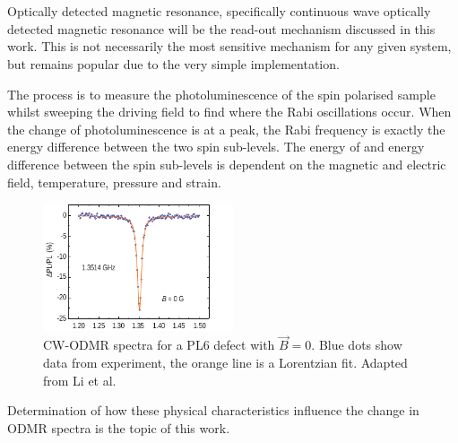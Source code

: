 \section{}\label{ODMR}
Optically detected magnetic resonance, specifically continuous wave optically detected magnetic resonance will be the read-out mechanism discussed in this work. This is not necessarily the most sensitive mechanism for any given system, but remains popular due to the very simple implementation. 

The process is to measure the photoluminescence of the spin polarised sample whilst sweeping the driving field to find where the Rabi oscillations occur. When the change of photoluminescence is at a peak, the Rabi frequency is exactly the energy difference between the two spin sub-levels. The energy of and energy difference between the spin sub-levels is dependent on the magnetic and electric field, temperature, pressure and strain. 

\begin{figure}[h]
    \begin{center}
        \includegraphics[width=0.5\textwidth]{figures/ODMR.pdf}
    \end{center}
    \caption{
        CW-ODMR spectra for a PL6 defect with $\vec{B} = 0$. Blue dots show data from experiment, the orange line is a Lorentzian fit. Adapted from Li et al.}\label{fig:}
\end{figure}


Determination of how these physical characteristics influence the change in ODMR spectra is the topic of this work. 






